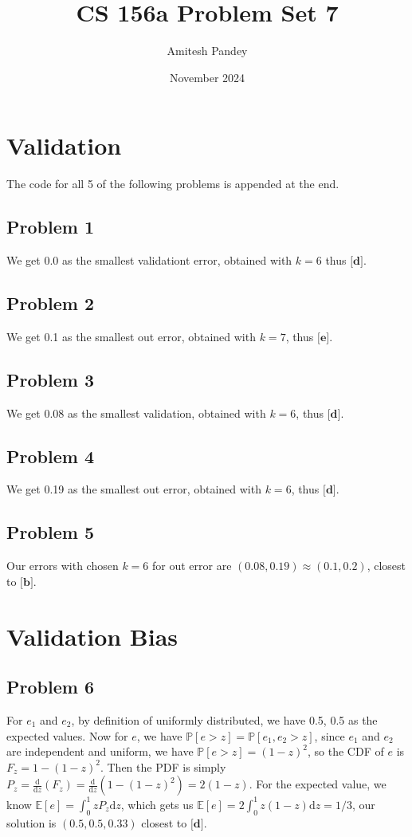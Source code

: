 \documentclass{article}
\title{CS 156a Problem Set 7}
\author{Amitesh Pandey}
\date{November 2024}
\begin{document}
\maketitle
\section*{Validation}
The code for all 5 of the following problems is appended at the end. 
\subsection*{Problem 1}
We get 0.0 as the smallest validationt error, obtained with $k =6$ thus $\textbf{[d]}$. 
\subsection*{Problem 2}
We get 0.1 as the smallest out error, obtained with $k = 7$, thus $\textbf{[e]}$.
\subsection*{Problem 3}
We get 0.08 as the smallest validation, obtained with $k = 6$, thus $\textbf{[d]}$.
\subsection*{Problem 4}
We get 0.19 as the smallest out error, obtained with $k = 6$, thus $\textbf{[d]}$.
\subsection*{Problem 5}
Our errors with chosen $k = 6$ for out error are $(0.08, 0.19) \approx (0.1, 0.2)$, closest to $\textbf{[b]}$. 
\section*{Validation Bias}
\subsection*{Problem 6}
For $e_1$ and $e_2$, by definition of uniformly distributed, we have 0.5, 0.5 as the expected values. Now for $e$, we have $\mathbb{P}[e > z] = \mathbb{P}[e_1, e_2 > z]$, since $e_1$ and $e_2$ are independent and uniform, we have $\mathbb{P}[e > z] = (1-z)^{2}$, so the CDF of $e$ is $F_z = 1 - (1-z)^{2}$. Then the PDF is simply $P_z = \frac{\text{d}}{\text{d}z} (F_z) = \frac{\text{d}}{\text{d}z}(1 - (1-z)^{2}) = 2(1-z)$. For the expected value, we know $\mathbb{E}[e] = \int_{0}^{1} zP_z\text{d}z$, which gets us $\mathbb{E}[e] = 2\int_{0}^{1}z(1-z)\text{d}z = 1/3$, our solution is $(0.5, 0.5, 0.33)$ closest to $\textbf{[d]}$. 
\newpage
\end{document}
